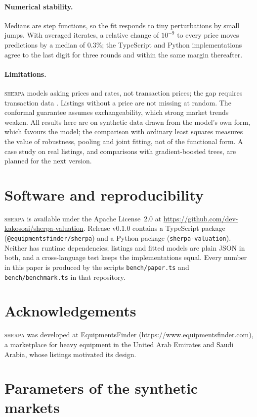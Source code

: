 \documentclass[11pt]{article}
\newcommand{\sherpa}{\textsc{sherpa}}
\begin{document}
\paragraph{Numerical stability.}
Medians are step functions, so the fit responds to tiny perturbations by small jumps. With averaged
iterates, a relative change of $10^{-9}$ to every price moves predictions by a median of 0.3\%; the
TypeScript and Python implementations agree to the last digit for three rounds and within the same
margin thereafter.

\paragraph{Limitations.}
\sherpa{} models asking prices and rates, not transaction prices; the gap requires transaction data
\citep[cf.][]{han2016}. Listings without a price are not missing at random. The conformal guarantee
assumes exchangeability, which strong market trends weaken. All results here are on synthetic data
drawn from the model's own form, which favours the model; the comparison with ordinary least squares
measures the value of robustness, pooling and joint fitting, not of the functional form. A case
study on real listings, and comparisons with gradient-boosted trees, are planned for the next
version.

\section{Software and reproducibility}
\label{sec:software}

\sherpa{} is available under the Apache License~2.0 at
\url{https://github.com/dev-kakosoai/sherpa-valuation}. Release v0.1.0 contains a TypeScript
package (\texttt{@equipmentsfinder/sherpa}) and a Python package (\texttt{sherpa-valuation}).
Neither has runtime dependencies; listings and fitted models are plain JSON in both, and a
cross-language test keeps the implementations equal. Every number in this paper is produced by
the scripts \texttt{bench/paper.ts} and \texttt{bench/benchmark.ts} in that repository.

\section*{Acknowledgements}
\sherpa{} was developed at EquipmentsFinder (\url{https://www.equipmentsfinder.com}), a marketplace
for heavy equipment in the United Arab Emirates and Saudi Arabia, whose listings motivated its
design.




\appendix
\section{Parameters of the synthetic markets}
\label{app:truth}

\end{document}

